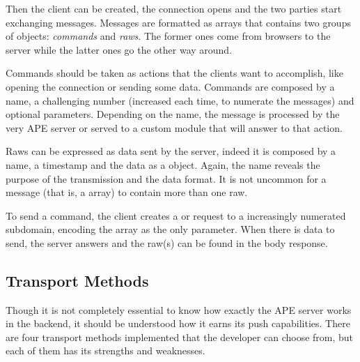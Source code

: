 Then the  client can be created, the connection opens and the two parties start exchanging messages.
Messages are formatted as  arrays that contains two groups of objects: \emph{commands} and \emph{raws}.
The former ones come from browsers to the server while the latter ones go the other way around.

Commands should be taken as actions that the clients want to accomplish, like opening the connection or sending some data.
Commands are composed by a name, a challenging number (increased each time, to numerate the messages) and optional parameters.
Depending on the name, the message is processed by the very \ac{APE} server or served to a custom module that will answer to that action.

Raws can be expressed as data sent by the server, indeed it is composed by a name, a timestamp and the data as a  object.
Again, the name reveals the purpose of the transmission and the data format.
It is not uncommon for a message (that is, a  array) to contain more than one raw.

To send a command, the client creates a  or  request to a increasingly numerated subdomain, encoding the  array as the only parameter.
When there is data to send, the server answers and the raw(s) can be found in the body response.


\subsection{Transport Methods} %
\label{sub:transport_methods}

Though it is not completely essential to know how exactly the \ac{APE} server works in the backend, it should be understood how it earns its push capabilities.
There are four transport methods implemented that the developer can choose from, but each of them has its strengths and weaknesses.

